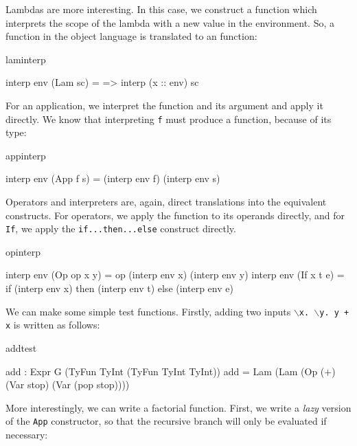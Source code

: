 \noindent
Lambdas are more interesting. In this case, we construct a function which
interprets the scope of the lambda with a new value in the environment. So, a
function in the object language is translated to an \Idris{} function:

\begin{SaveVerbatim}{laminterp}

interp env (Lam sc) = \x => interp (x :: env) sc

\end{SaveVerbatim}

\noindent
For an application, we interpret the function and its argument and apply it
directly. We know that interpreting \texttt{f} must produce a function, because of its
type:

\begin{SaveVerbatim}{appinterp}

interp env (App f s) = (interp env f) (interp env s)

\end{SaveVerbatim}

\noindent
Operators and interpreters are, again, direct translations into the equivalent
\Idris{} constructs. For operators, we apply the function to its operands directly,
and for \texttt{If}, we apply the \Idris{} \texttt{if...then...else} construct
directly.

\begin{SaveVerbatim}{opinterp}

interp env (Op op x y) = op (interp env x) (interp env y)
interp env (If x t e)  = if (interp env x) then (interp env t) 
                                           else (interp env e)

\end{SaveVerbatim}

\noindent
We can make some simple test functions. Firstly, adding two inputs
\texttt{$\backslash$x. $\backslash$y. y + x} is written as follows:

\begin{SaveVerbatim}{addtest}

add : Expr G (TyFun TyInt (TyFun TyInt TyInt))
add = Lam (Lam (Op (+) (Var stop) (Var (pop stop))))
  
\end{SaveVerbatim}

\noindent
More interestingly, we can write a factorial function. First, we write a \emph{lazy}
version of the \texttt{App} constructor, so that the recursive branch will only
be evaluated if necessary:

